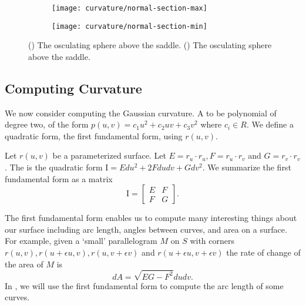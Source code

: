 \begin{figure}[htb]
    \captionsetup[subfigure]{justification=centering}
    \centering
    \begin{subfigure}[b]{0.25\textwidth}
        \texttt{[image: curvature/normal-section-max]}
       \subcaption{}\label{fig:normal-section-max}
    \end{subfigure}
        \hspace{1cm}
        \begin{subfigure}[b]{0.25\textwidth}
        \texttt{[image: curvature/normal-section-min]}
        \subcaption{}\label{fig:normal-section-min}
        \end{subfigure}
    \caption{() The osculating sphere above the saddle.
        () The osculating sphere above the saddle.
    }
    \label{fig:normal-sections}
\end{figure}


\subsection{Computing Curvature}
We now consider computing the Gaussian curvature.
A  to be polynomial of degree two, of the form $p(u,v)=c_1u^2+c_2uv+c_3v^2$ 
where $c_i\in R$.
We define a quadratic form, the first fundamental form, using $r(u,v)$.

Let $r(u,v)$ be a parameterized surface.
Let $E=r_u\cdot r_u, F=r_u\cdot r_v$ and  $G=r_v\cdot r_v$.
The 
is the quadratic form $\mathrm{I}=Edu^2+2Fdudv +Gdv^2$.
We summarize the first fundamental form as a matrix $$\mathrm{I}=\begin{bmatrix}
E & F \\
F & G 
\end{bmatrix}.$$

The first fundamental form enables us to  compute many interesting
things about our surface including arc length, angles between curves,
and area on a surface.
For example,
given a `small' parallelogram $M$ on $S$ with corners $r(u,v),r(u+\epsilon u, v), r(u,v+\epsilon v)$ 
and $r(u+\epsilon u, v+\epsilon v)$ the rate of change of the area of $M$ is 
$$dA=\sqrt{EG-F^2}dudv.$$
In , we will use the first fundamental form to compute the arc length of some curves.

